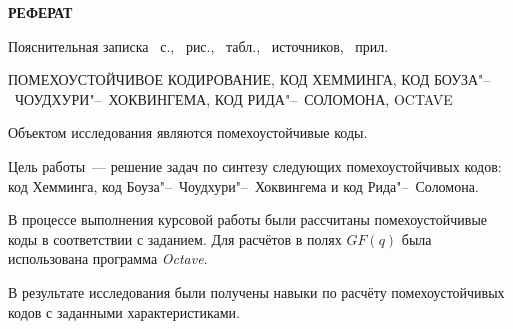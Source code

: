 \begin{center}
  \Large{\textbf{РЕФЕРАТ}}
\end{center}

Пояснительная записка ~с., ~рис.,
~табл., ~источников,
~прил.

ПОМЕХОУСТОЙЧИВОЕ КОДИРОВАНИЕ, КОД ХЕММИНГА, КОД
БОУЗА"--~ЧОУДХУРИ"--~ХОКВИНГЕМА, КОД РИДА"--~СОЛОМОНА, OCTAVE

Объектом исследования являются помехоустойчивые коды.

Цель работы~--- решение задач по синтезу следующих помехоустойчивых
кодов: код Хемминга, код Боуза"--~Чоудхури"--~Хоквингема и код
Рида"--~Соломона.

В процессе выполнения курсовой работы были рассчитаны помехоустойчивые
коды в соответствии с заданием. Для расчётов в полях $GF(q)$ была
использована программа \textit{Octave}.

В результате исследования были получены навыки по расчёту
помехоустойчивых кодов с заданными характеристиками.
\newpage


